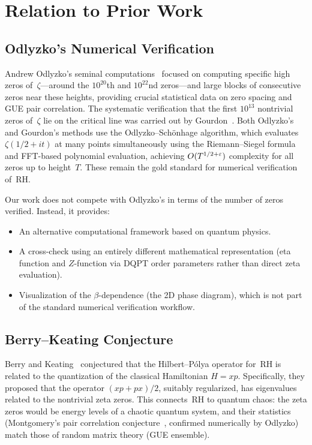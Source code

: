 \section{Relation to Prior Work}
\label{sec:prior}

\subsection{Odlyzko's Numerical Verification}
\label{sec:odlyzko}

Andrew Odlyzko's seminal computations~\cite{odlyzko1989,odlyzko2001} focused on
computing specific high zeros of~$\zeta$---around the $10^{20}$th and $10^{22}$nd
zeros---and large blocks of consecutive zeros near these heights, providing crucial
statistical data on zero spacing and GUE pair correlation. The systematic verification
that the first $10^{13}$ nontrivial zeros of~$\zeta$ lie on the critical line was carried
out by Gourdon~\cite{gourdon2004}. Both Odlyzko's and Gourdon's methods use the
Odlyzko--Sch\"onhage algorithm, which evaluates $\zeta(1/2 + it)$ at many points
simultaneously using the Riemann--Siegel formula and FFT-based polynomial evaluation,
achieving $O(T^{1/2+\varepsilon})$ complexity for all zeros up to height~$T$. These remain the
gold standard for numerical verification of~RH.

Our work does not compete with Odlyzko's in terms of the number of zeros verified.
Instead, it provides:
\begin{itemize}
  \item An alternative computational framework based on quantum physics.
  \item A cross-check using an entirely different mathematical representation (eta
        function and $Z$-function via DQPT order parameters rather than direct zeta
        evaluation).
  \item Visualization of the $\beta$-dependence (the 2D phase diagram), which is not part
        of the standard numerical verification workflow.
\end{itemize}


\subsection{Berry--Keating Conjecture}
\label{sec:berry-keating}

Berry and Keating~\cite{berrykeating1999} conjectured that the Hilbert--P\'olya operator
for~RH is related to the quantization of the classical Hamiltonian $H = xp$. Specifically,
they proposed that the operator $(xp + px)/2$, suitably regularized, has eigenvalues
related to the nontrivial zeta zeros. This connects~RH to quantum chaos: the zeta zeros
would be energy levels of a chaotic quantum system, and their statistics (Montgomery's
pair correlation conjecture~\cite{montgomery1973}, confirmed numerically by Odlyzko)
match those of random matrix theory (GUE ensemble).

